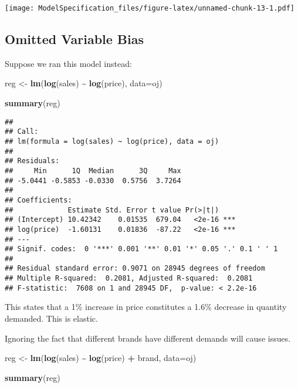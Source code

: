 \documentclass[
]{article}
\newenvironment{Shaded}{\begin{snugshade}}{\end{snugshade}}
\newcommand{\AttributeTok}[1]{\textcolor[rgb]{0.13,0.29,0.53}{#1}}
\newcommand{\FunctionTok}[1]{\textcolor[rgb]{0.13,0.29,0.53}{\textbf{#1}}}
\newcommand{\NormalTok}[1]{#1}
\newcommand{\OtherTok}[1]{\textcolor[rgb]{0.56,0.35,0.01}{#1}}
\newcommand{\SpecialCharTok}[1]{\textcolor[rgb]{0.81,0.36,0.00}{\textbf{#1}}}
\begin{document}
\texttt{[image: ModelSpecification\_files/figure-latex/unnamed-chunk-13-1.pdf]}

\subsection{Omitted Variable Bias}\label{omitted-variable-bias}

Suppose we ran this model instead:

\begin{Shaded}
\begin{Highlighting}[]
\NormalTok{reg }\OtherTok{\textless{}{-}} \FunctionTok{lm}\NormalTok{(}\FunctionTok{log}\NormalTok{(sales) }\SpecialCharTok{\textasciitilde{}} \FunctionTok{log}\NormalTok{(price), }\AttributeTok{data=}\NormalTok{oj)}

\FunctionTok{summary}\NormalTok{(reg)}
\end{Highlighting}
\end{Shaded}

\begin{verbatim}
## 
## Call:
## lm(formula = log(sales) ~ log(price), data = oj)
## 
## Residuals:
##     Min      1Q  Median      3Q     Max 
## -5.0441 -0.5853 -0.0330  0.5756  3.7264 
## 
## Coefficients:
##             Estimate Std. Error t value Pr(>|t|)    
## (Intercept) 10.42342    0.01535  679.04   <2e-16 ***
## log(price)  -1.60131    0.01836  -87.22   <2e-16 ***
## ---
## Signif. codes:  0 '***' 0.001 '**' 0.01 '*' 0.05 '.' 0.1 ' ' 1
## 
## Residual standard error: 0.9071 on 28945 degrees of freedom
## Multiple R-squared:  0.2081, Adjusted R-squared:  0.2081 
## F-statistic:  7608 on 1 and 28945 DF,  p-value: < 2.2e-16
\end{verbatim}

This states that a 1\% increase in price constitutes a 1.6\% decrease in
quantity demanded. This is elastic.

Ignoring the fact that different brands have different demands will
cause issues.

\begin{Shaded}
\begin{Highlighting}[]
\NormalTok{reg }\OtherTok{\textless{}{-}} \FunctionTok{lm}\NormalTok{(}\FunctionTok{log}\NormalTok{(sales) }\SpecialCharTok{\textasciitilde{}} \FunctionTok{log}\NormalTok{(price) }\SpecialCharTok{+}\NormalTok{ brand, }\AttributeTok{data=}\NormalTok{oj)}

\FunctionTok{summary}\NormalTok{(reg)}
\end{Highlighting}
\end{Shaded}
\end{document}
